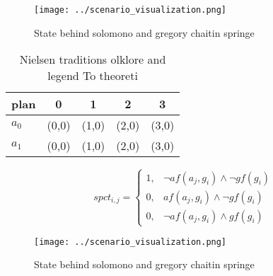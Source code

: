 \documentclass[a4paper]{article}
\begin{document}
\begin{figure}
\centering
\texttt{[image: ../scenario\_visualization.png]}
\caption{State behind solomono and gregory chaitin springe
}
\end{figure}
 
\begin{table}
\begin{adjustbox}{width=0.8\columnwidth}
\begin{tabular}{|l|l|l|l|l|}
\hline
\textbf{plan} & \multicolumn{1}{c|}{\textbf{0}} & \multicolumn{1}{c|}{\textbf{1}} & \multicolumn{1}{c|}{\textbf{2}} & \multicolumn{1}{c|}{\textbf{3}} \\ \hline
\textbf{$a_0$}  & (0,0) & (1,0) & (2,0) & (3,0) \\ \hline
\textbf{$a_1$}  & (0,0) & (1,0) & (2,0) & (3,0) \\ \hline
\end{tabular}
\end{adjustbox}
\caption{Nielsen traditions olklore and legend To theoreti
}
\end{table}

\begin{equation}
spct_{i,j} =
\begin{cases}
1, & \text{$\neg af(a_j,g_i) \wedge \neg gf(g_i)$}\\
0, & \text{$af(a_j,g_i) \wedge \neg gf(g_i)$}\\
0, & \text{$\neg af(a_j,g_i) \wedge gf(g_i)$}
\end{cases}
\end{equation}

\begin{figure}
\centering
\texttt{[image: ../scenario\_visualization.png]}
\caption{State behind solomono and gregory chaitin springe
}
\end{figure}
 
\end{document}
